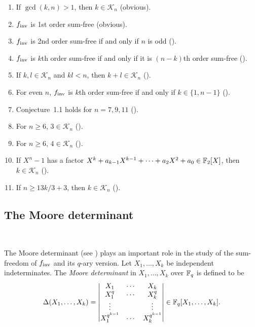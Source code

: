 \documentclass{amsart}
\numberwithin{equation}{section}
\theoremstyle{definition}
\newcommand{\f}{\Bbb F}
\newcommand{\fin}{f_{\text{\rm inv}}}
\begin{document}
\begin{enumerate}
\item If $\gcd(k,n)>1$, then $k\in\mathcal K_n$ (obvious).

\item $\fin$ is 1st order sum-free (obvious).

\item $\fin$ is 2nd order sum-free if and only if $n$ is odd (\cite{Nyberg-LNCS-1994}).

\item $\fin$ is $k$th order sum-free if and only if it is $(n-k)$th order sum-free (\cite[Theorem~3]{Carlet-pre}).

\item If $k,l\in\mathcal K_n$ and $kl<n$, then $k+l\in\mathcal K_n$ (\cite[Theorem~4]{Carlet-pre}).

\item For even $n$, $\fin$ is $k$th order sum-free if and only if $k\in\{1,n-1\}$ (\cite[Theorem~5.2]{Carlet-Hou}).

\item Conjecture~1.1 holds for $n=7,9,11$ (\cite[Table~1]{Carlet-pre}).

\item For $n\ge 6$, $3\in\mathcal K_n$ (\cite[Theorem~6]{Carlet-pre}).

\item For $n\ge 6$, $4\in\mathcal K_n$ (\cite[Theorem~7]{Carlet-pre}).

\item If $X^n-1$ has a factor $X^k+a_{k-1}X^{k-1}+\cdots+a_2X^2+a_0\in\f_2[X]$, then $k\in\mathcal K_n$ (\cite[Corollary~3.2]{Carlet-Hou}).

\item If $n\ge 13k/3+3$, then $k\in\mathcal K_n$ (\cite[Theorem~4.2]{Carlet-Hou}).

\end{enumerate}

\subsection{The Moore determinant}\label{sec2.3}\

The Moore determinant (see \cite{Moore-BAMS-1896}) plays an important role in the study of the sum-freedom of $\fin$ and its $q$-ary version.
Let $X_1,\dots,X_k$ be independent indeterminates. The {\em Moore determinant} in $X_1,\dots,X_k$ over $\f_q$ is defined to be
\[
\Delta(X_1,\dots,X_k)=\left|
\begin{matrix}
X_1&\cdots&X_k\cr
X_1^q&\cdots&X_k^q\cr
\vdots&&\vdots\cr
X_1^{q^{k-1}}&\cdots&X_k^{q^{k-1}}
\end{matrix}\right|\in\f_q[X_1,\dots,X_k].
\]
\end{document}
